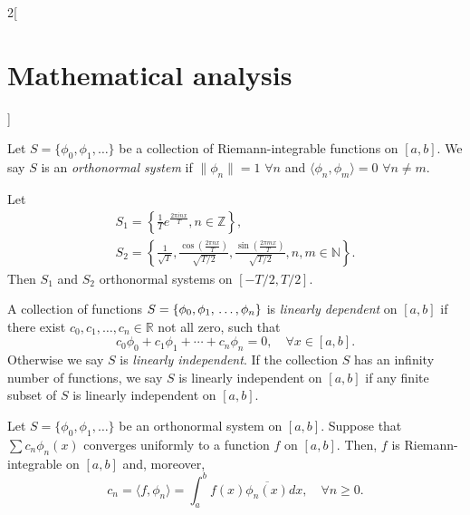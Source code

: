 \documentclass[../../../main.tex]{subfiles}
\begin{document}
\begin{multicols}{2}[\section{Mathematical analysis}]
\begin{definition}
\end{definition}
\begin{definition}
Let $S=\{\phi_0,\phi_1,\ldots\}$ be a collection of Riemann-integrable functions on $[a,b]$. We say $S$ is an \textit{orthonormal system} if $\|\phi_n\|=1$ $\forall n$ and $\langle\phi_n,\phi_m\rangle=0$ $\forall n\ne m$.
\end{definition}
\begin{prop}
Let \begin{gather*}
    S_1=\left\{\frac{1}{T}e^{\frac{2\pi inx}{T}},n\in\mathbb{Z}\right\},\\ S_2=\left\{\frac{1}{\sqrt{T}},\frac{\cos\left(\frac{2\pi nx}{T}\right)}{\sqrt{T/2}},\frac{\sin\left(\frac{2\pi mx}{T}\right)}{\sqrt{T/2}},n,m\in\mathbb{N}\right\}.
\end{gather*} Then $S_1$ and $S_2$ orthonormal systems on $[-T/2,T/2]$.
\end{prop}
\begin{definition}
A collection of functions $S=\{\phi_0,\phi_1,\\\ldots,\phi_n\}$ is \textit{linearly dependent} on $[a,b]$ if there exist $c_0,c_1,\ldots,c_n\in\mathbb{R}$ not all zero, such that $$c_0\phi_0+c_1\phi_1+\cdots+c_n\phi_n=0,\quad\forall x\in[a,b].$$ Otherwise we say $S$ is \textit{linearly independent}. If the collection $S$ has an infinity number of functions, we say $S$ is linearly independent on $[a,b]$ if any finite subset of $S$ is linearly independent on $[a,b]$.
\end{definition}
\begin{theorem}
Let $S=\{\phi_0,\phi_1,\ldots\}$ be an orthonormal system on $[a,b]$. Suppose that $\sum c_n\phi_n(x)$ converges uniformly to a function $f$ on $[a,b]$. Then, $f$ is Riemann-integrable on $[a,b]$ and, moreover, $$c_n=\langle f,\phi_n\rangle=\int_a^bf(x)\overline{\phi_n(x)}dx,\quad\forall n\geq 0.$$
\end{theorem}

\end{multicols}
\end{document}
